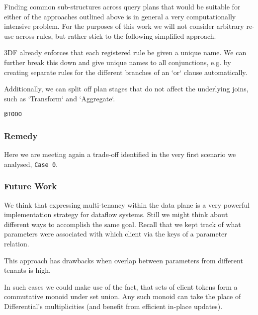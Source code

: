 \documentclass[../catalog.tex]{subfiles}
\begin{document}
Finding common sub-structures across query plans that would be
suitable for either of the approaches outlined above is in general a
very computationally intensive problem. For the purposes of this work
we will not consider arbitrary re-use across rules, but rather stick
to the following simplified approach.

3DF already enforces that each registered rule be given a unique
name. We can further break this down and give unique names to all
conjunctions, e.g. by creating separate rules for the different
branches of an `or` clause automatically.

Additionally, we can split off plan stages that do not affect the
underlying joins, such as `Transform` and `Aggregate`.

\texttt{@TODO}

\subsubsection{Remedy}

Here we are meeting again a trade-off identified in the very first
scenario we analysed, \texttt{Case 0}.

\subsubsection{Future Work}

We think that expressing multi-tenancy within the data plane is a very
powerful implementation strategy for dataflow systems. Still we might
think about different ways to accomplish the same goal. Recall that we
kept track of what parameters were associated with which client via
the keys of a parameter relation.

This approach has drawbacks when overlap between parameters from
different tenants is high.

In such cases we could make use of the fact, that sets of client
tokens form a commutative monoid under set union. Any such monoid can
take the place of Differential's multiplicities (and benefit from
efficient in-place updates).
\end{document}
